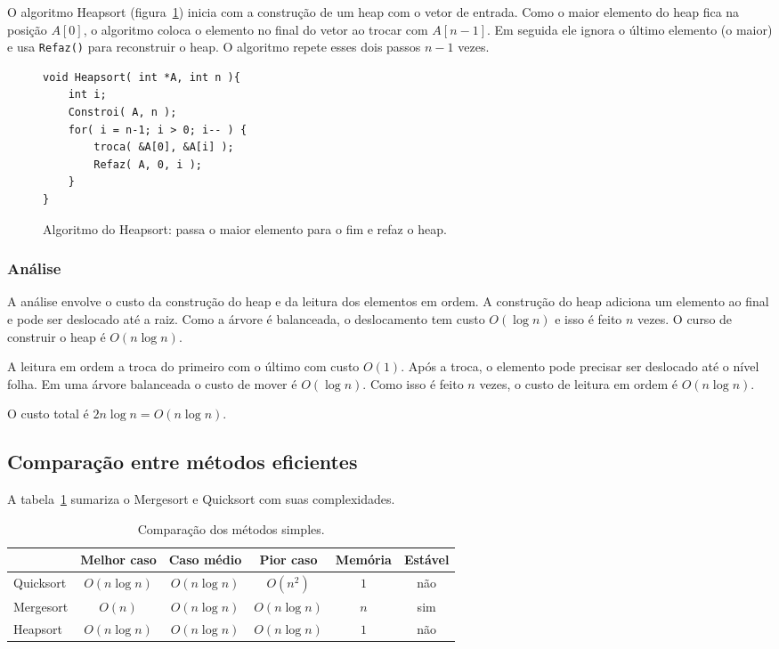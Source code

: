 O algoritmo Heapsort (figura~\ref{aula03:algo:heapsort}) inicia com a construção
de um heap com o vetor de entrada.
Como o maior elemento do heap fica na posição $A[0]$,
o algoritmo coloca o elemento no final do vetor ao trocar com $A[n-1]$.
Em seguida ele ignora o último elemento (o maior) e usa \lstinline{Refaz()} para
reconstruir o heap.
O algoritmo repete esses dois passos $n-1$ vezes.
%
\begin{figure}[!htb]
\centering
\begin{framed}
\begin{lstlisting}
void Heapsort( int *A, int n ){
	int i;
	Constroi( A, n );
	for( i = n-1; i > 0; i-- ) {
		troca( &A[0], &A[i] );
		Refaz( A, 0, i );
	}
}
\end{lstlisting}
\end{framed}
\caption{Algoritmo do Heapsort: passa o maior elemento para o fim e refaz o heap.}
\label{aula03:algo:heapsort}
\end{figure}

\subsubsection*{Análise}

A análise envolve o custo da construção do heap e da leitura dos elementos em ordem.
A construção do heap adiciona um elemento ao final e pode ser deslocado até a raiz.
Como a árvore é balanceada, o deslocamento tem custo $O(\log n)$ e 
isso é feito $n$ vezes.
O curso de construir o heap é $O(n \log n)$. 

A leitura em ordem a troca do primeiro com o último com custo $O(1)$. Após a troca,
o elemento pode precisar ser deslocado até o nível folha.
Em uma árvore balanceada o custo de mover é $O(\log n)$.
Como isso é feito $n$ vezes, o custo de leitura em ordem é $O(n \log n)$.

O custo total é $2n \log n = O(n \log n)$.

\subsection{Comparação entre métodos eficientes}

A tabela~\ref{aula03:tab:caso02} sumariza o Mergesort e Quicksort com suas complexidades.
%
\begin{table}[!ht]
\centering
\caption{Comparação dos métodos simples.}
\begin{tabular}{lccccc}
\hline
          & Melhor caso & Caso médio & Pior caso & Memória & Estável \\ \hline
Quicksort & $O(n \log n)$ & $O(n \log n)$ & $O(n^2)$ & $1$ & não \\ \hline
Mergesort & $O(n)$ & $O(n \log n)$ & $O(n \log n)$ & $n$ & sim \\ \hline
Heapsort & $O(n \log n)$ & $O(n \log n)$ & $O(n \log n)$ & $1$ & não \\ \hline
%
\end{tabular}
\label{aula03:tab:caso02}
\end{table}

